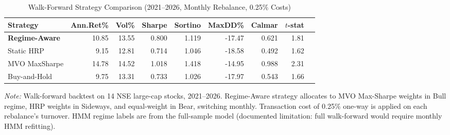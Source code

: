 \begin{table}[htbp]
\centering
\caption{Walk-Forward Strategy Comparison (2021--2026, Monthly Rebalance, 0.25\% Costs)}
\label{tab:strategy_comparison}
\begin{tabular}{lrrrrrrrr}
\toprule
Strategy & Ann.Ret\% & Vol\% & Sharpe & Sortino & MaxDD\% & Calmar & $t$-stat \\
\midrule
\textbf{Regime-Aware} & 10.85 & 13.55 & 0.800 & 1.119 & -17.47 & 0.621 & 1.81 \\
Static HRP & 9.15 & 12.81 & 0.714 & 1.046 & -18.58 & 0.492 & 1.62 \\
MVO MaxSharpe & 14.78 & 14.52 & 1.018 & 1.418 & -14.95 & 0.988 & 2.31 \\
Buy-and-Hold & 9.75 & 13.31 & 0.733 & 1.026 & -17.97 & 0.543 & 1.66 \\
\midrule
\bottomrule
\end{tabular}
\begin{tablenotes}
\small
\item \textit{Note:} Walk-forward backtest on 14 NSE large-cap stocks, 2021--2026. Regime-Aware strategy allocates to MVO Max-Sharpe weights in Bull regime, HRP weights in Sideways, and equal-weight in Bear, switching monthly. Transaction cost of 0.25\% one-way is applied on each rebalance's turnover. HMM regime labels are from the full-sample model (documented limitation: full walk-forward would require monthly HMM refitting).
\end{tablenotes}
\end{table}